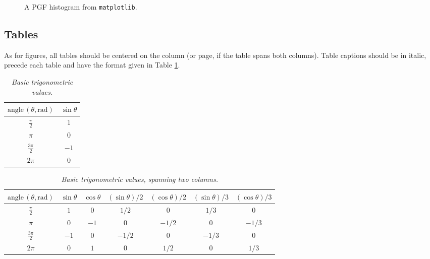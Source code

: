 \documentclass[twoside,a4paper]{article}
\begin{document}
\begin{figure}
    \begin{center}
      
    \end{center}
    \caption{A PGF histogram from \texttt{matplotlib}.}
\end{figure}




\subsection{Tables}
As for figures, all tables should be centered on the column (or page, if the table spans both columns).
Table captions should be in italic, precede each table and have the format given in Table \ref{tab:example}.

\begin{table}[ht]
  \caption{\itshape Basic trigonometric values.}
	\centering
	\begin{tabular}{|c|c|}
		\hline
		$\mathrm{angle}\,(\theta, \mathrm{rad})$ & $\sin \theta$ \\\hline
		$\frac{\pi}{2}$ & $1$ \\
		$\pi$ & $0$ \\
		$\frac{3\pi}{2}$ & $-1$ \\
		$2\pi$ & $0$ \\\hline
	\end{tabular}
	\label{tab:example}
\end{table}

\begin{table}[ht]
  \caption{{\it Basic trigonometric values, spanning two columns.}}
	\centering
  \begin{tabular}{|c|c|c|c|c|c|c|}\hline
    $\mathrm{angle}\, (\theta, \mathrm{rad})$ & $\sin \theta$ & $\cos \theta $ & $(\sin \theta)/2 $ & $(\cos \theta) /2 $ & $(\sin \theta)/3 $ & $(\cos \theta)/3$    \\\hline
    $\frac{\pi}{2}$ & $1$ & $0$ & $1/2$ & $0$ & $1/3$ & $0$ \\
    $\pi$ & $0$ & $-1$ & $0$ & $-1/2$ & $0$ & $-1/3$\\
    $\frac{3\pi}{2}$ & $-1$ & $0$ & $-1/2$ & $0$ & $-1/3$ & $0$ \\
    $2\pi$ & $0$ & $1$ & $0$ & $1/2$ & $0$ & $1/3$ \\\hline
 \end{tabular}
  \label{tab:example2}
\end{table}
\end{document}
